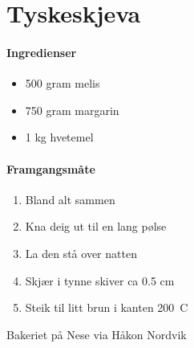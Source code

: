 \section{﻿Tyskeskjeva}


\paragraph{Ingredienser}
\begin{itemize}[noitemsep]
	\item 500 gram melis
	\item 750 gram margarin
	\item 1 kg hvetemel
\end{itemize}

\paragraph{Framgangsmåte}
\begin{enumerate}[noitemsep]
	\item Bland alt sammen
	\item Kna deig ut til en lang pølse
	\item La den stå over natten
	\item Skjær i tynne skiver ca 0.5 cm
	\item Steik til litt brun i kanten 200\degree~C
\end{enumerate}

Bakeriet på Nese via Håkon Nordvik
